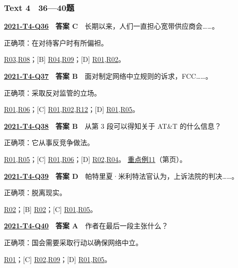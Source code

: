 \documentclass[11pt,a4paper]{article}
\begin{document}
\subsubsection{Text 4　36—40题}
\label{idx-2021-T4-Q36}
\noindent\textbf{\href{https://zj139.github.io/math-notes/english/fbb30e5f6024dd40ef6ed807/\#q36}{2021-T4-Q36}　答案 C}　长期以来，人们一直担心宽带供应商会……。\par\nopagebreak
\noindent 正确项：在对待客户时有所偏袒。\par\nopagebreak
\noindent [A] \hyperref[cat-R03]{R03},\hyperref[cat-R08]{R08}；[B] \hyperref[cat-R04]{R04},\hyperref[cat-R09]{R09}；[D] \hyperref[cat-R01]{R01},\hyperref[cat-R02]{R02}。
\par\smallskip
{}\label{idx-2021-T4-Q37}
\noindent\textbf{\href{https://zj139.github.io/math-notes/english/fbb30e5f6024dd40ef6ed807/\#q37}{2021-T4-Q37}　答案 B}　面对制定网络中立规则的诉求，FCC……。\par\nopagebreak
\noindent 正确项：采取反对监管的立场。\par\nopagebreak
\noindent [A] \hyperref[cat-R01]{R01},\hyperref[cat-R06]{R06}；[C] \hyperref[cat-R01]{R01},\hyperref[cat-R02]{R02},\hyperref[cat-R12]{R12}；[D] \hyperref[cat-R01]{R01},\hyperref[cat-R05]{R05}。
\par\smallskip
{}\label{idx-2021-T4-Q38}
\noindent\textbf{\href{https://zj139.github.io/math-notes/english/fbb30e5f6024dd40ef6ed807/\#q38}{2021-T4-Q38}　答案 B}　从第 3 段可以得知关于 AT\&T 的什么信息？\par\nopagebreak
\noindent 正确项：它从事反竞争做法。\par\nopagebreak
\noindent [A] \hyperref[cat-R01]{R01},\hyperref[cat-R05]{R05}；[C] \hyperref[cat-R01]{R01},\hyperref[cat-R06]{R06}；[D] \hyperref[cat-R02]{R02},\hyperref[cat-R04]{R04}。
\hyperref[case-2021-T4-Q38]{重点例11}（第\pageref{case-2021-T4-Q38}页）。
\par\smallskip
{}\label{idx-2021-T4-Q39}
\noindent\textbf{\href{https://zj139.github.io/math-notes/english/fbb30e5f6024dd40ef6ed807/\#q39}{2021-T4-Q39}　答案 D}　帕特里夏·米利特法官认为，上诉法院的判决……。\par\nopagebreak
\noindent 正确项：脱离现实。\par\nopagebreak
\noindent [A] \hyperref[cat-R02]{R02}；[B] \hyperref[cat-R02]{R02}；[C] \hyperref[cat-R01]{R01},\hyperref[cat-R05]{R05}。
\par\smallskip
{}\label{idx-2021-T4-Q40}
\noindent\textbf{\href{https://zj139.github.io/math-notes/english/fbb30e5f6024dd40ef6ed807/\#q40}{2021-T4-Q40}　答案 A}　作者在最后一段主张什么？\par\nopagebreak
\noindent 正确项：国会需要采取行动以确保网络中立。\par\nopagebreak
\noindent [B] \hyperref[cat-R01]{R01}；[C] \hyperref[cat-R02]{R02},\hyperref[cat-R09]{R09}；[D] \hyperref[cat-R01]{R01},\hyperref[cat-R05]{R05}。
\par\smallskip
\clearpage\setlength{\parskip}{1pt}
\end{document}
